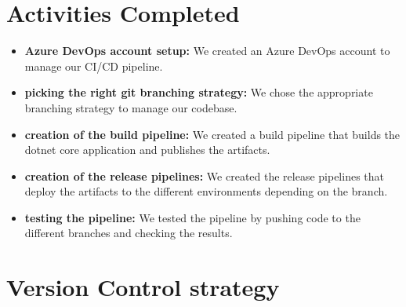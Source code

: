 \section{Activities Completed}
\begin{itemize}
    \item \textbf{Azure DevOps account setup:} We created an Azure DevOps account to manage our CI/CD pipeline.
    \item \textbf{picking the right git branching strategy:} We chose the appropriate branching strategy to manage our codebase.
    \item \textbf{creation of the build pipeline:} We created a build pipeline that builds the dotnet core application and publishes the artifacts.
    \item \textbf{creation of the release pipelines:} We created the release pipelines that deploy the artifacts to the different environments depending on the branch.
    \item \textbf{testing the pipeline:} We tested the pipeline by pushing code to the different branches and checking the results.
\end{itemize}

\section{Version Control strategy}
